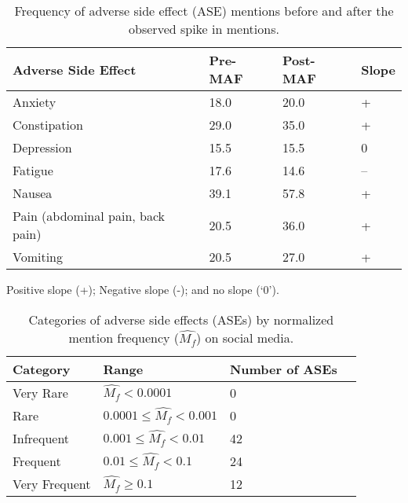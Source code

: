 \documentclass[referee,bst/sn-basic]{sn-jnl}%
\begin{document}
\begin{table}[h]
    \centering
    \caption{Frequency of adverse side effect (ASE) mentions before and after the observed spike in mentions.}
    \begin{tabular}{llll}
    \toprule
                Adverse Side Effect   & Pre-MAF & Post-MAF & Slope\\
                \midrule
                Anxiety & 18.0& 20.0 & +\\
                Constipation& 29.0& 35.0 & +\\
                Depression& 15.5& 15.5 & 0 \\
                Fatigue& 17.6& 14.6 & -- \\
                Nausea& 39.1& 57.8 & +\\
                Pain (abdominal pain, back pain) & 20.5& 36.0 & +\\
                Vomiting& 20.5& 27.0 & +\\
    \bottomrule
    \end{tabular}
     Positive slope (+); Negative slope (-); and no slope (`0').
    \label{tbl:freq_before_after}
\end{table}


\begin{table}[h]
    \centering
    \caption{Categories of adverse side effects (ASEs) by normalized mention frequency ($\hat{M_f}$) on social media.}
    \label{tbl:freq_1}
    \begin{tabular}{llll}
    \toprule
    Category   &  Range & Number of ASEs\\
    \midrule
      Very Rare   &  $\hat{M_f} < 0.0001$ & 0 \\
      Rare   & $  0.0001 \leq \hat{M_f} < 0.001$  & 0 \\
      Infrequent   & $ 0.001 \leq \hat{M_f} < 0.01$ & 42 \\
      Frequent   & $0.01 \leq \hat{M_f} < 0.1$ & 24 \\
      Very Frequent   & $\hat{M_f} \geq  0.1$ & 12 \\
    \bottomrule
    \end{tabular}
\end{table}



\newpage
\end{document}

